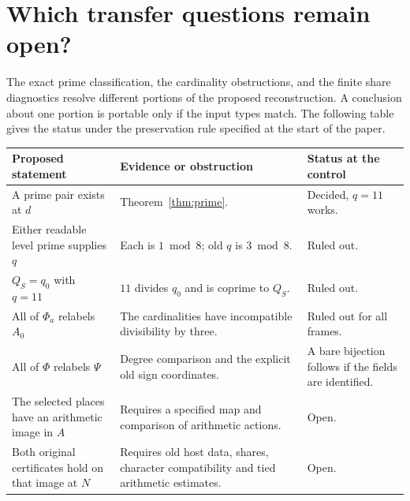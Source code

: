 \documentclass[12pt,letterpaper]{article}
\begin{document}
\section{Which transfer questions remain open?}\label{sec:decisions}
The exact prime classification, the cardinality obstructions, and the finite share diagnostics resolve different portions of the proposed reconstruction. A conclusion about one portion is portable only if the input types match. The following table gives the status under the preservation rule specified at the start of the paper.

\begin{center}\small
\begin{tabularx}{\linewidth}{@{}p{.28\linewidth}Yp{.26\linewidth}@{}}\toprule
Proposed statement & Evidence or obstruction & Status at the control\\\midrule
A prime pair exists at $d$ & Theorem~\ref{thm:prime}. & Decided, $q=11$ works.\\
Either readable level prime supplies $q$ & Each is $1\bmod8$; old $q$ is $3\bmod8$. & Ruled out.\\
$Q_S=q_0$ with $q=11$ & $11$ divides $q_0$ and is coprime to $Q_S$. & Ruled out.\\
All of $\Phi_a$ relabels $A_0$ & The cardinalities have incompatible divisibility by three. & Ruled out for all frames.\\
All of $\Phi$ relabels $\Psi$ & Degree comparison and the explicit old sign coordinates. & A bare bijection follows if the fields are identified.\\
The selected places have an arithmetic image in $A$ & Requires a specified map and comparison of arithmetic actions. & Open.\\
Both original certificates hold on that image at $N$ & Requires old host data, shares, character compatibility and tied arithmetic estimates. & Open.\\\bottomrule
\end{tabularx}\end{center}
\end{document}
